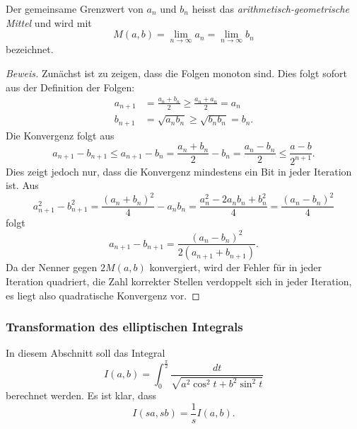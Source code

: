 \begin{definition}
Der gemeinsame Grenzwert von $a_n$ und $b_n$ heisst das
{\em arithmetisch-geometrische Mittel} und wird mit 
\[
M(a,b)
=
\lim_{n\to\infty} a_n
=
\lim_{n\to\infty} b_n
\]
bezeichnet.
%
\end{definition}

\begin{proof}[Beweis]
Zunächst ist zu zeigen, dass die Folgen monoton sind.
Dies folgt sofort aus der Definition der Folgen:
\begin{align*}
a_{n+1} &= \frac{a_n+b_n}{2} \ge \frac{a_n+a_n}{2} = a_n
\\
b_{n+1} &= \sqrt{a_nb_n} \ge \sqrt{b_nb_n} = b_n.
\end{align*}
Die Konvergenz folgt aus
\[
a_{n+1}-b_{n+1}
\le
a_{n+1}-b_n
=
\frac{a_n+b_n}{2}-b_n
=
\frac{a_n-b_n}2
\le
\frac{a-b}{2^{n+1}}.
\]
Dies zeigt jedoch nur, dass die Konvergenz mindestens ein
Bit in jeder Iteration ist.
Aus
\[
a_{n+1}^2 - b_{n+1}^2
=
\frac{(a_n+b_n)^2}{4} - a_nb_n
=
\frac{a_n^2 -2a_nb_n+b_n^2}{4}
=
\frac{(a_n-b_n)^2}{4}
\]
folgt
\[
a_{n+1}-b_{n+1}
=
\frac{(a_n-b_n)^2}{2(a_{n+1}+b_{n+1})}.
\]
Da der Nenner gegen $2M(a,b)$ konvergiert, wird der Fehler für in
jeder Iteration quadriert, die Zahl korrekter Stellen verdoppelt sich
in jeder Iteration, es liegt also quadratische Konvergenz vor.
\end{proof}

%
%
\subsubsection{Transformation des elliptischen Integrals}
In diesem Abschnitt soll das Integral
\[
I(a,b)
=
\int_0^{\frac{\pi}2}
\frac{dt}{\sqrt{a^2\cos^2 t + b^2\sin^2t}}
\]
berechnet werden.
Es ist klar, dass
\[
I(sa,sb)
=
\frac{1}{s} I(a,b).
\]

